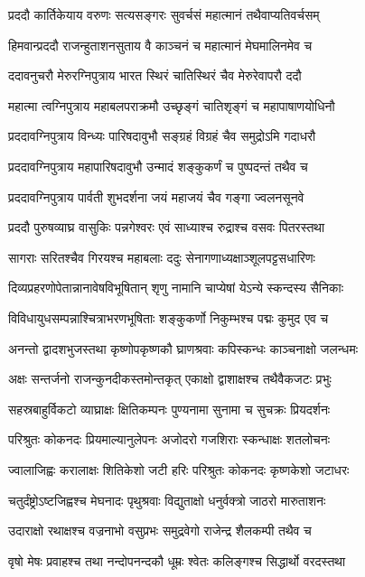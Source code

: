 \twolineshloka
{प्रददौ कार्तिकेयाय वरुणः सत्यसङ्गरः}
{सुवर्चसं महात्मानं तथैवाप्यतिवर्चसम्}


\twolineshloka
{हिमवान्प्रददौ राजन्हुताशनसुताय वै}
{काञ्चनं च महात्मानं मेघमालिनमेव च}


\twolineshloka
{ददावनुचरौ मेरुरग्निपुत्राय भारत}
{स्थिरं चातिस्थिरं चैव मेरुरेवापरौ ददौ}


\twolineshloka
{महात्मा त्वग्निपुत्राय महाबलपराक्रमौ}
{उच्छृङ्गं चातिशृङ्गं च महापाषाणयोधिनौ}


\twolineshloka
{प्रददावग्निपुत्राय विन्ध्यः पारिषदावुभौ}
{सङ्ग्रहं विग्रहं चैव समुद्रोऽमि गदाधरौ}


\twolineshloka
{प्रददावग्निपुत्राय महापारिषदावुभौ}
{उन्मादं शङ्कुकर्णं च पुष्पदन्तं तथैव च}


\twolineshloka
{प्रददावग्निपुत्राय पार्वती शुभदर्शना}
{जयं महाजयं चैव गङ्गा ज्वलनसूनवे}


\twolineshloka
{प्रददौ पुरुषव्याघ्र वासुकिः पन्नगेश्वरः}
{एवं साध्याश्च रुद्राश्च वसवः पितरस्तथा}


\twolineshloka
{सागराः सरितश्चैव गिरयश्च महाबलाः}
{ददुः सेनागणाध्यक्षाञ्शूलपट्टसधारिणः}


\twolineshloka
{दिव्यप्रहरणोपेतान्नानावेषविभूषितान्}
{शृणु नामानि चाप्येषां येऽन्ये स्कन्दस्य सैनिकाः}


\twolineshloka
{विविधायुधसम्पन्नाश्चित्राभरणभूषिताः}
{शङ्कुकर्णो निकुम्भश्च पद्मः कुमुद एव च}


\twolineshloka
{अनन्तो द्वादशभुजस्तथा कृष्णोपकृष्णकौ}
{घ्राणश्रवाः कपिस्कन्धः काञ्चनाक्षो जलन्धमः}


\twolineshloka
{अक्षः सन्तर्जनो राजन्कुनदीकस्तमोन्तकृत्}
{एकाक्षो द्वाशाक्षश्च तथैवैकजटः प्रभुः}


\twolineshloka
{सहस्रबाहुर्विकटो व्याघ्राक्षः क्षितिकम्पनः}
{पुण्यनामा सुनामा च सुचक्रः प्रियदर्शनः}


\twolineshloka
{परिश्रुतः कोकनदः प्रियमाल्यानुलेपनः}
{अजोदरो गजशिराः स्कन्धाक्षः शतलोचनः}


\twolineshloka
{ज्वालाजिह्वः करालाक्षः शितिकेशो जटी हरिः}
{परिश्रुतः कोकनदः कृष्णकेशो जटाधरः}


\twolineshloka
{चतुर्दंष्ट्रोऽष्टजिह्वश्च मेघनादः पृथुश्रवाः}
{विद्युताक्षो धनुर्वक्त्रो जाठरो मारुताशनः}


\twolineshloka
{उदाराक्षो रथाक्षश्च वज्रनाभो वसुप्रभः}
{समुद्रवेगो राजेन्द्र शैलकम्पी तथैव च}


\twolineshloka
{वृषो मेषः प्रवाहश्च तथा नन्दोपनन्दकौ}
{धूम्रः श्वेतः कलिङ्गश्च सिद्धार्थो वरदस्तथा}


